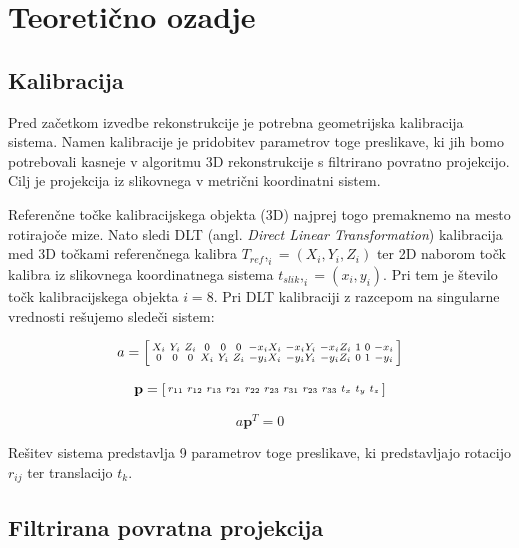 \documentclass[journal,a4paper,twoside]{sty/IEEEtran}
\begin{document}
\section{Teoretično ozadje}

\subsection{Kalibracija}

Pred začetkom izvedbe rekonstrukcije je potrebna geometrijska kalibracija sistema. Namen kalibracije je pridobitev parametrov toge preslikave, ki jih bomo potrebovali kasneje v algoritmu 3D rekonstrukcije s filtrirano povratno projekcijo. Cilj je projekcija iz slikovnega v metrični koordinatni sistem.

Referenčne točke kalibracijskega objekta (3D) najprej togo premaknemo na mesto rotirajoče mize. Nato sledi DLT (angl. \textit{Direct Linear Transformation}) kalibracija med 3D točkami referenčnega kalibra $T_{ref},_i = (X_i, Y_i, Z_i)$ ter 2D naborom točk kalibra iz slikovnega koordinatnega sistema $t_{slik},_i = (x_i, y_i)$. Pri tem je število točk kalibracijskega objekta $i = 8$. Pri DLT kalibraciji z razcepom na singularne vrednosti rešujemo sledeči sistem:


\begin{equation}
\setcounter{MaxMatrixCols}{12}
a = 
\begin{bsmallmatrix}
X_i & Y_i & Z_i & 0 & 0 & 0 & -x_i X_i & -x_i Y_i & -x_i Z_i & 1 & 0 & -x_i \\ 
0 & 0 & 0 & X_i & Y_i & Z_i & -y_i X_i & -y_i Y_i & -y_i Z_i & 0 & 1 & -y_i \\
\end{bsmallmatrix}
\end{equation}

\begin{equation}
\setcounter{MaxMatrixCols}{12}
\textbf{p} =
\begin{bsmallmatrix}
r_{11} & r_{12} & r_{13} & r_{21} & r_{22} & r_{23} & r_{31} & r_{23} & r_{33} & t_x & t_y & t_z
\end{bsmallmatrix}
\end{equation}

\begin{equation}
a\textbf{p}^T=0
\end{equation}

Rešitev sistema predstavlja 9 parametrov toge preslikave, ki predstavljajo rotacijo $r_{ij}$ ter translacijo $t_k$.

\subsection{Filtrirana povratna projekcija}
\end{document}

